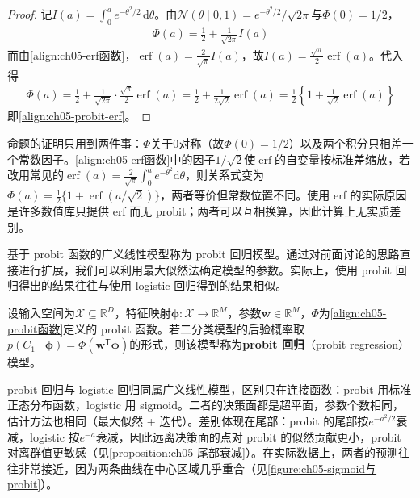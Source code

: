 \documentclass[../../main.tex]{subfiles}
\begin{document}
\begin{proof}
记$I(a)=\int_0^a e^{-\theta^{2}/2}\,\mathrm{d}\theta$。由$\mathcal{N}(\theta\mid0,1)=e^{-\theta^{2}/2}/\sqrt{2\pi}$与$\Phi(0)=1/2$，
\begin{align}
  \Phi(a)=\frac{1}{2}+\frac{1}{\sqrt{2\pi}}I(a)
\end{align}
而由\eqref{align:ch05-erf函数}，$\operatorname{erf}(a)=\frac{2}{\sqrt{\pi}}I(a)$，故$I(a)=\frac{\sqrt{\pi}}{2}\operatorname{erf}(a)$。代入得
\begin{align}
  \Phi(a)=\frac{1}{2}+\frac{1}{\sqrt{2\pi}}\cdot\frac{\sqrt{\pi}}{2}\operatorname{erf}(a)=\frac{1}{2}+\frac{1}{2\sqrt{2}}\operatorname{erf}(a)=\frac{1}{2}\left\{1+\frac{1}{\sqrt{2}}\operatorname{erf}(a)\right\}
\end{align}
即\eqref{align:ch05-probit-erf}。
\end{proof}

\begin{remark}
命题的证明只用到两件事：$\Phi$关于0对称（故$\Phi(0)=1/2$）以及两个积分只相差一个常数因子。\eqref{align:ch05-erf函数}中的因子$1/\sqrt{2}$使$\operatorname{erf}$的自变量按标准差缩放，若改用常见的$\operatorname{erf}(a)=\frac{2}{\sqrt{\pi}}\int_0^{a}e^{-\theta^{2}}\mathrm{d}\theta$，则关系式变为$\Phi(a)=\frac12\{1+\operatorname{erf}(a/\sqrt2)\}$，两者等价但常数位置不同。使用 erf 的实际原因是许多数值库只提供 erf 而无 probit；两者可以互相换算，因此计算上无实质差别。
\end{remark}

基于 probit 函数的广义线性模型称为 probit 回归模型。通过对前面讨论的思路直接进行扩展，我们可以利用最大似然法确定模型的参数。实际上，使用 probit 回归得出的结果往往与使用 logistic 回归得到的结果相似。

\begin{definition}[probit 回归]\label{definition:ch05-probit回归}
设输入空间为$\mathcal{X}\subseteq\mathbb{R}^{D}$，特征映射$\boldsymbol{\phi}:\mathcal{X}\to\mathbb{R}^{M}$，参数$\boldsymbol{w}\in\mathbb{R}^{M}$，$\Phi$为\eqref{align:ch05-probit函数}定义的 probit 函数。若二分类模型的后验概率取$p(C_1\mid\boldsymbol{\phi})=\Phi(\boldsymbol{w}^{\mathsf{T}}\boldsymbol{\phi})$的形式，则该模型称为\textbf{probit 回归}（probit regression）模型。
\end{definition}

\begin{remark}
probit 回归与 logistic 回归同属广义线性模型，区别只在连接函数：probit 用标准正态分布函数，logistic 用 sigmoid。二者的决策面都是超平面，参数个数相同，估计方法也相同（最大似然 + 迭代）。差别体现在尾部：probit 的尾部按$e^{-a^{2}/2}$衰减，logistic 按$e^{-a}$衰减，因此远离决策面的点对 probit 的似然贡献更小，probit 对离群值更敏感（见\cref{proposition:ch05-尾部衰减}）。在实际数据上，两者的预测往往非常接近，因为两条曲线在中心区域几乎重合（见\cref{figure:ch05-sigmoid与probit}）。
\end{remark}
\end{document}
